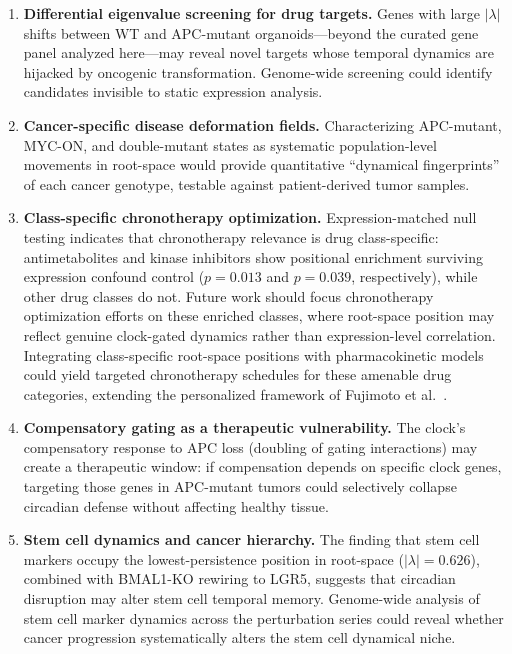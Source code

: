 \documentclass[11pt,letterpaper]{article}
\begin{document}
\begin{enumerate}[leftmargin=*, label=\textbf{\arabic*.}]

\item \textbf{Differential eigenvalue screening for drug targets.} Genes with large $|\lambda|$ shifts between WT and APC-mutant organoids---beyond the curated gene panel analyzed here---may reveal novel targets whose temporal dynamics are hijacked by oncogenic transformation. Genome-wide screening could identify candidates invisible to static expression analysis.

\item \textbf{Cancer-specific disease deformation fields.} Characterizing APC-mutant, MYC-ON, and double-mutant states as systematic population-level movements in root-space would provide quantitative ``dynamical fingerprints'' of each cancer genotype, testable against patient-derived tumor samples.

\item \textbf{Class-specific chronotherapy optimization.} Expression-matched null testing indicates that chronotherapy relevance is drug class-specific: antimetabolites and kinase inhibitors show positional enrichment surviving expression confound control ($p = 0.013$ and $p = 0.039$, respectively), while other drug classes do not. Future work should focus chronotherapy optimization efforts on these enriched classes, where root-space position may reflect genuine clock-gated dynamics rather than expression-level correlation. Integrating class-specific root-space positions with pharmacokinetic models could yield targeted chronotherapy schedules for these amenable drug categories, extending the personalized framework of Fujimoto et al.\ \citep{fujimoto2025}.

\item \textbf{Compensatory gating as a therapeutic vulnerability.} The clock's compensatory response to APC loss (doubling of gating interactions) may create a therapeutic window: if compensation depends on specific clock genes, targeting those genes in APC-mutant tumors could selectively collapse circadian defense without affecting healthy tissue.

\item \textbf{Stem cell dynamics and cancer hierarchy.} The finding that stem cell markers occupy the lowest-persistence position in root-space ($|\lambda| = 0.626$), combined with BMAL1-KO rewiring to LGR5, suggests that circadian disruption may alter stem cell temporal memory. Genome-wide analysis of stem cell marker dynamics across the perturbation series could reveal whether cancer progression systematically alters the stem cell dynamical niche.


\end{enumerate}
\end{document}
